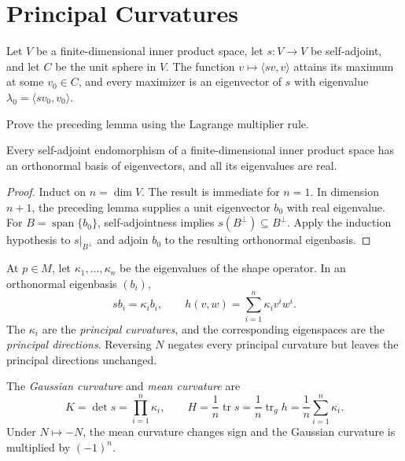 \section{Principal Curvatures}

\begin{lemma}
\label{lem:self-adjoint-eigenvector-extremum}
Let $V$ be a finite-dimensional inner product space, let
$s\colon V\to V$ be self-adjoint, and let $C$ be the unit sphere in $V$.
The function $v\mapsto\langle sv,v\rangle$ attains its maximum at some
$v_0\in C$, and every maximizer is an eigenvector of $s$ with eigenvalue
$\lambda_0=\langle sv_0,v_0\rangle$.
\end{lemma}

\begin{exercise}
\label{exer:lagrange-multiplier-eigenvector}
Prove the preceding lemma using the Lagrange multiplier rule.
\end{exercise}

\begin{proposition}
\label{prop:finite-dimensional-spectral-theorem}
Every self-adjoint endomorphism of a finite-dimensional inner product space
has an orthonormal basis of eigenvectors, and all its eigenvalues are real.
\end{proposition}

\begin{proof}
\sketch Induct on $n=\dim V$. The result is immediate for $n=1$. In dimension
$n+1$, the preceding lemma supplies a unit eigenvector $b_0$ with real
eigenvalue. For $B=\operatorname{span}\{b_0\}$, self-adjointness implies
$s(B^\perp)\subseteq B^\perp$. Apply the induction hypothesis to
$s|_{B^\perp}$ and adjoin $b_0$ to the resulting orthonormal eigenbasis.
\end{proof}

At $p\in M$, let $\kappa_1,\ldots,\kappa_n$ be the eigenvalues of the shape
operator. In an orthonormal eigenbasis $(b_i)$,
\[
sb_i=\kappa_i b_i,
\qquad
h(v,w)=\sum_{i=1}^n\kappa_i v^iw^i.
\]
The $\kappa_i$ are the \emph{principal curvatures}, and the corresponding
eigenspaces are the \emph{principal directions}. Reversing $N$ negates every
principal curvature but leaves the principal directions unchanged.

The \emph{Gaussian curvature} and \emph{mean curvature} are
\[
K=\det s=\prod_{i=1}^n\kappa_i,
\qquad
H=\frac1n\operatorname{tr}s
=\frac1n\operatorname{tr}_g h
=\frac1n\sum_{i=1}^n\kappa_i.
\]
Under $N\mapsto-N$, the mean curvature changes sign and the Gaussian curvature
is multiplied by $(-1)^n$.

